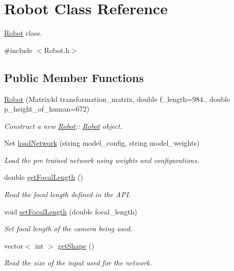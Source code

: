 \hypertarget{classRobot}{}\section{Robot Class Reference}
\label{classRobot}


\hyperlink{classRobot}{Robot} class.  




{\ttfamily \#include $<$Robot.\+h$>$}

\subsection*{Public Member Functions}
\begin{DoxyCompactItemize}
\item 
\hyperlink{classRobot_ad99a1ce9846d6334c2d9e9f52bbadce2}{Robot} (Matrix4d transformation\+\_\+matrix, double f\+\_\+length=984., double p\+\_\+height\+\_\+of\+\_\+human=672)
\begin{DoxyCompactList}\small\item\em Construct a new \hyperlink{classRobot}{Robot}\+:\+: \hyperlink{classRobot}{Robot} object. \end{DoxyCompactList}\item 
Net \hyperlink{classRobot_a082dee8da5e4847ded0a6a1373172073}{load\+Network} (string model\+\_\+config, string model\+\_\+weights)
\begin{DoxyCompactList}\small\item\em Load the pre trained network using weights and configurations. \end{DoxyCompactList}\item 
double \hyperlink{classRobot_ad5b286958dbf40329f8cebdb9c9c4987}{get\+Focal\+Length} ()
\begin{DoxyCompactList}\small\item\em Read the focal length defined in the A\+PI. \end{DoxyCompactList}\item 
void \hyperlink{classRobot_aad2cd63f57d4feaaa7ec92f49ba72d5e}{set\+Focal\+Length} (double focal\+\_\+length)
\begin{DoxyCompactList}\small\item\em Set focal length of the camera being used. \end{DoxyCompactList}\item 
vector$<$ int $>$ \hyperlink{classRobot_a3a1999a77bc11f070daaa0655ddff66b}{get\+Shape} ()
\begin{DoxyCompactList}\small\item\em Read the size of the input used for the network. \end{DoxyCompactList}\item 

\end{DoxyCompactItemize}
